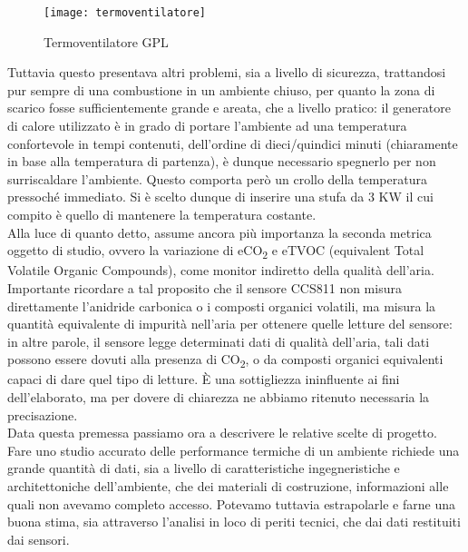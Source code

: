 \documentclass[fleqn,10pt]{SelfArx} %
\begin{document}
\begin{figure}[htb!]\centering
	\texttt{[image: termoventilatore]}
	\caption{Termoventilatore GPL}
	\label{fig:termoventilatore}
\end{figure}

Tuttavia questo presentava altri problemi, sia a livello di sicurezza, trattandosi pur sempre di una combustione 
in un ambiente chiuso, per quanto la zona di scarico fosse sufficientemente grande e areata, che a livello pratico:
il generatore di calore utilizzato è in grado di portare l'ambiente ad una temperatura confortevole in tempi 
contenuti, dell'ordine di dieci/quindici minuti (chiaramente in base alla temperatura di partenza), è dunque 
necessario spegnerlo per non surriscaldare l'ambiente. Questo comporta però un crollo della temperatura pressoché 
immediato. Si è scelto dunque di inserire una stufa da 3 KW il cui compito è quello di mantenere la temperatura costante.\\
Alla luce di quanto detto, assume ancora più importanza la seconda metrica oggetto di studio, ovvero la 
variazione di eCO\textsubscript{2} e eTVOC (equivalent Total Volatile Organic Compounds), come monitor indiretto della 
qualità dell'aria.\\
Importante ricordare a tal proposito che il sensore CCS811 non misura direttamente l'anidride carbonica o i composti organici 
volatili, ma misura la quantità equivalente di impurità nell'aria per ottenere quelle letture del sensore: in altre parole, 
il sensore legge determinati dati di qualità dell'aria, tali dati possono essere dovuti alla presenza di CO\textsubscript{2}, 
o da composti organici equivalenti capaci di dare quel tipo di letture. È una sottigliezza ininfluente ai fini dell'elaborato, 
ma per dovere di chiarezza ne abbiamo ritenuto necessaria la precisazione.\\

Data questa premessa passiamo ora a descrivere le relative scelte di progetto.\\
Fare uno studio accurato delle performance termiche di un ambiente richiede una grande quantità di dati, sia a livello 
di caratteristiche ingegneristiche e architettoniche dell'ambiente, che dei materiali di costruzione, informazioni 
alle quali non avevamo completo accesso. Potevamo tuttavia estrapolarle e farne una buona stima, sia attraverso 
l'analisi in loco di periti tecnici, che dai dati restituiti dai sensori.\\
\end{document}
